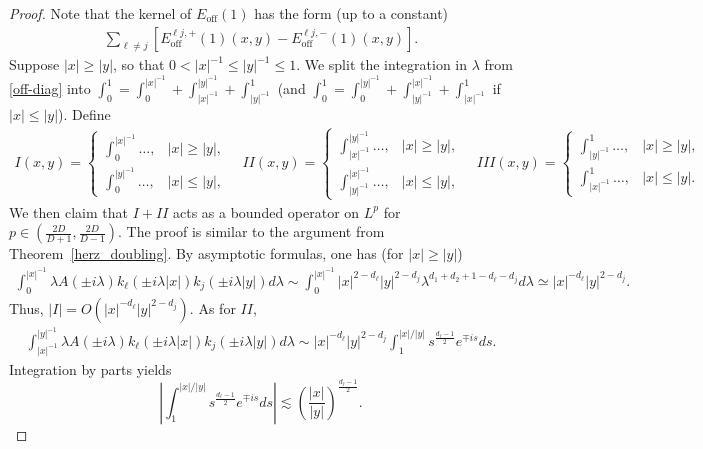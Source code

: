 \documentclass[12pt]{amsart}
\begin{document}
\begin{proof}
Note that the kernel of $E_{\mathrm{off}}(1)$ has the form (up to a constant)
\begin{align}\label{off-diag}
    \sum_{\ell \ne j} \left[ E_{\mathrm{off}}^{\ell j,+}(1)(x,y) - E_{\mathrm{off}}^{\ell j,-}(1)(x,y)  \right].
\end{align}
Suppose $|x|\ge |y|$, so that $0<|x|^{-1}\le |y|^{-1} \le 1$. We split the integration in $\lambda$ from \eqref{off-diag} into $\int_0^1 = \int_0^{|x|^{-1}} + \int_{|x|^{-1}}^{|y|^{-1}} + \int_{|y|^{-1}}^1$ (and $\int_0^1 = \int_0^{|y|^{-1}} + \int_{|y|^{-1}}^{|x|^{-1}} + \int_{|x|^{-1}}^1$ if $|x|\le |y|$). Define
\begin{align*}
    I(x,y) = \begin{cases}
        \int_0^{|x|^{-1}} \dots, & |x|\ge |y|,\\
        \int_0^{|y|^{-1}}\dots, & |x|\le |y|,
    \end{cases}\quad
    II(x,y) = \begin{cases}
        \int_{|x|^{-1}}^{|y|^{-1}} \dots, & |x|\ge |y|,\\
    \int_{|y|^{-1}}^{|x|^{-1}}\dots, & |x|\le |y|,
    \end{cases}\quad
    III(x,y) = \begin{cases}
        \int_{|y|^{-1}}^1 \dots, & |x|\ge |y|,\\
    \int_{|x|^{-1}}^1\dots, & |x|\le |y|.
    \end{cases}
\end{align*}
We then claim that $I+II$ acts as a bounded operator on $L^p$ for $p\in \left( \frac{2D}{D+1}, \frac{2D}{D-1} \right)$. The proof is similar to the argument from Theorem~\ref{herz_doubling}. By asymptotic formulas, one has (for $|x|\ge |y|$)
\begin{align*}
     \int_0^{|x|^{-1}} \lambda A(\pm i\lambda) k_\ell(\pm i\lambda|x|) k_j(\pm i\lambda|y|) d\lambda \sim \int_0^{|x|^{-1}} |x|^{2-d_\ell} |y|^{2-d_j} \lambda^{d_1+d_2+1-d_\ell-d_j} d\lambda \simeq |x|^{-d_\ell} |y|^{2-d_j}.
\end{align*}
Thus, $|I| = O(|x|^{-d_\ell} |y|^{2-d_j})$. As for $II$, 
\begin{align*}
    \int_{|x|^{-1}}^{|y|^{-1}} \lambda A(\pm i\lambda) k_\ell(\pm i\lambda|x|) k_j(\pm i\lambda|y|) d\lambda \sim |x|^{-d_\ell} |y|^{2-d_j} \int_1^{|x|/|y|} s^{\frac{d_\ell-1}{2}} e^{\mp i s} ds.
\end{align*}
Integration by parts yields
\begin{equation*}
    \left|\int_1^{|x|/|y|} s^{\frac{d_\ell-1}{2}} e^{\mp i s} ds\right|\lesssim \left( \frac{|x|}{|y|} \right)^{\frac{d_\ell-1}{2}}.

\end{equation*}
\end{proof}
\end{document}
